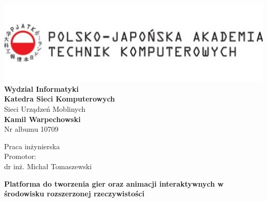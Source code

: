 \documentclass[12pt]{article}
\begin{document}
\thispagestyle{firststyle}
\begin{center}
\includegraphics[width=1\textwidth]{images/logo.jpg}
\textbf{Wydzial Informatyki} \\
\vspace{3em}
\textbf{Katedra Sieci Komputerowych} \\
Sieci Urządzeń Moblinych \\
\vspace{3em}
\textbf{Kamil Warpechowski} \\
Nr albumu 10709
\end{center}


\vspace{3em}
{\addtolength{\leftskip}{70mm}

\noindent
Praca inżynierska
\\Promotor:
\\dr inż. Michał Tomaszewski

}

\vspace{3em}

\begin{center}
\textbf {
Platforma do tworzenia gier oraz animacji interaktywnych w środowisku rozszerzonej rzeczywistości
}
\end{center}

\newpage
\tableofcontents
\newpage
  











\newpage
\thispagestyle{empty}
  
\listoffigures
\listoftables
\lstlistoflistings
\end{document}
